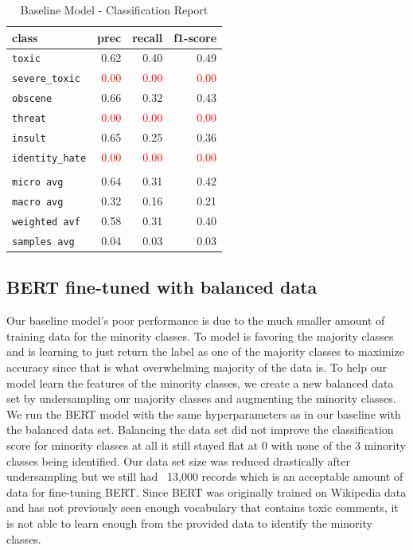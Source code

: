 \documentclass[11pt,a4paper]{article}
\begin{document}
\begin{table}
\centering
\begin{tabular}{lrrr}
\hline
\textbf{class} & \textbf{prec} & \textbf{recall} & \textbf{f1-score}\\
\hline
\verb|toxic| & 0.62 & 0.40 & 0.49 \\
\verb|severe_toxic| & \textcolor{red}{0.00} & \textcolor{red}{0.00} & \textcolor{red}{0.00} \\
\verb|obscene| & 0.66 & 0.32 & 0.43 \\
\verb|threat| & \textcolor{red}{0.00} & \textcolor{red}{0.00} & \textcolor{red}{0.00} \\
\verb|insult| & 0.65 & 0.25 & 0.36 \\
\verb|identity_hate| & \textcolor{red}{0.00} & \textcolor{red}{0.00} & \textcolor{red}{0.00} \\
\vspace{2\baselineskip}\\
\verb|micro avg| & 0.64 & 0.31 & 0.42 \\
\verb|macro avg| & 0.32 & 0.16 & 0.21 \\
\verb|weighted avf| & 0.58 & 0.31 & 0.40 \\
\verb|samples avg| & 0.04 & 0.03 & 0.03 \\
\hline
\end{tabular}
\caption{Baseline Model - Classification Report}
\end{table}

\subsection{BERT fine-tuned with balanced data}
Our baseline model's poor performance is due to the much smaller amount of training data for the minority classes. To model is favoring the majority classes and is learning to just return the label as one of the majority classes to maximize accuracy since that is what overwhelming majority of the data is. To help our model learn the features of the minority classes, we create a new balanced data set by undersampling our majority classes and augmenting the minority classes. We run the BERT model with the same hyperparameters as in our baseline with the balanced data set.
Balancing the data set did not improve the classification score for minority classes at all it still stayed flat at 0 with none of the 3 minority classes being identified. Our data set size was reduced drastically after undersampling but we still had ~13,000 records which is an acceptable amount of data for fine-tuning BERT.
Since BERT was originally trained on Wikipedia data and has not previously seen enough vocabulary that contains toxic comments, it is not able to learn enough from the provided data to identify the minority classes. 
\end{document}
